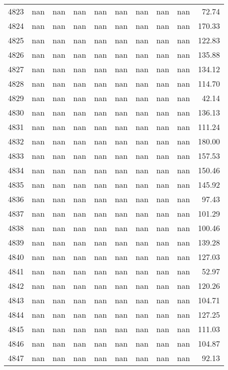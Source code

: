 \begin{tabular}{lrrrrrrrrr}
4823 & nan & nan & nan & nan & nan & nan & nan & nan & 72.74 \\
4824 & nan & nan & nan & nan & nan & nan & nan & nan & 170.33 \\
4825 & nan & nan & nan & nan & nan & nan & nan & nan & 122.83 \\
4826 & nan & nan & nan & nan & nan & nan & nan & nan & 135.88 \\
4827 & nan & nan & nan & nan & nan & nan & nan & nan & 134.12 \\
4828 & nan & nan & nan & nan & nan & nan & nan & nan & 114.70 \\
4829 & nan & nan & nan & nan & nan & nan & nan & nan & 42.14 \\
4830 & nan & nan & nan & nan & nan & nan & nan & nan & 136.13 \\
4831 & nan & nan & nan & nan & nan & nan & nan & nan & 111.24 \\
4832 & nan & nan & nan & nan & nan & nan & nan & nan & 180.00 \\
4833 & nan & nan & nan & nan & nan & nan & nan & nan & 157.53 \\
4834 & nan & nan & nan & nan & nan & nan & nan & nan & 150.46 \\
4835 & nan & nan & nan & nan & nan & nan & nan & nan & 145.92 \\
4836 & nan & nan & nan & nan & nan & nan & nan & nan & 97.43 \\
4837 & nan & nan & nan & nan & nan & nan & nan & nan & 101.29 \\
4838 & nan & nan & nan & nan & nan & nan & nan & nan & 100.46 \\
4839 & nan & nan & nan & nan & nan & nan & nan & nan & 139.28 \\
4840 & nan & nan & nan & nan & nan & nan & nan & nan & 127.03 \\
4841 & nan & nan & nan & nan & nan & nan & nan & nan & 52.97 \\
4842 & nan & nan & nan & nan & nan & nan & nan & nan & 120.26 \\
4843 & nan & nan & nan & nan & nan & nan & nan & nan & 104.71 \\
4844 & nan & nan & nan & nan & nan & nan & nan & nan & 127.25 \\
4845 & nan & nan & nan & nan & nan & nan & nan & nan & 111.03 \\
4846 & nan & nan & nan & nan & nan & nan & nan & nan & 104.87 \\
4847 & nan & nan & nan & nan & nan & nan & nan & nan & 92.13 \\

\end{tabular}
